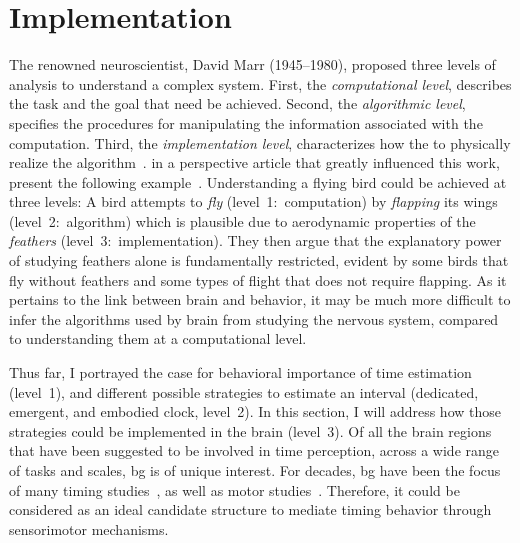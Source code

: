 \section{Implementation}
\label{ch:intro:implementation}
The renowned neuroscientist, David Marr (1945--1980), proposed three levels of analysis to understand a complex system.
First, the \emph{computational level}, describes the task and the goal that need be achieved.
Second, the \emph{algorithmic level}, specifies the procedures for manipulating the information associated with the computation.
Third, the \emph{implementation level}, characterizes how the to physically realize the algorithm~\cite{Willshaw2015Marr}.
 in a perspective article that greatly influenced this work, present the following example~\cite{Krakauer2017Neuron}.
Understanding a flying bird could be achieved at three levels:
A bird attempts to \textit{fly} (level~1:~computation) by \textit{flapping} its wings (level~2:~algorithm) which is plausible due to aerodynamic properties of the \textit{feathers} (level~3:~implementation).
They then argue that the explanatory power of studying feathers alone is fundamentally restricted, evident by some birds that fly without feathers and some types of flight that does not require flapping.
As it pertains to the link between brain and behavior, it may be much more difficult to infer the algorithms used by brain from studying the nervous system, compared to understanding them at a computational level.
\par
Thus far, I portrayed the case for behavioral importance of time estimation (level~1), and different possible strategies to estimate an interval (dedicated, emergent, and embodied clock, level~2).
In this section, I will address how those strategies could be implemented in the brain (level~3).
Of all the brain regions that have been suggested to be involved in time perception\footnotemark, across a wide range of tasks and scales, \gls{bg} is of unique interest.
For decades, \gls{bg} have been the focus of many timing studies~\cite[see][]{Paton2018NeuronRev}, as well as motor studies~\cite[see][]{Turner2010CurrOpinNeurobiol}.
Therefore, it could be considered as an ideal candidate structure to mediate timing behavior through sensorimotor mechanisms.

